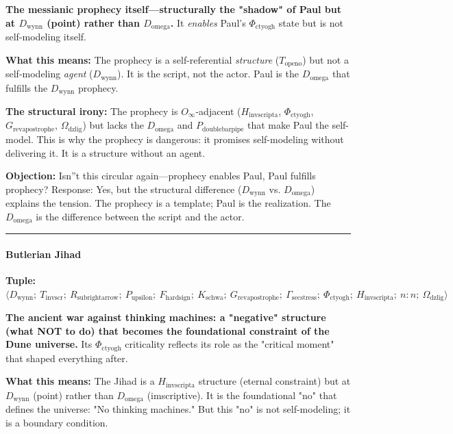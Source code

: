 \documentclass[12pt,a4paper]{article}
\begin{document}
\textbf{The messianic prophecy itself---structurally the "shadow" of Paul but at $D_{\text{wynn}}$ (point) rather than $D_{\text{omega}}$.} It \emph{enables} Paul's $\Phi_{\text{ctyogh}}$ state but is not self-modeling itself.

\textbf{What this means:} The prophecy is a self-referential \emph{structure} ($T_{\text{openo}}$) but not a self-modeling \emph{agent} ($D_{\text{wynn}}$). It is the script, not the actor. Paul is the $D_{\text{omega}}$ that fulfills the $D_{\text{wynn}}$ prophecy.

\textbf{The structural irony:} The prophecy is $O_{\infty}$-adjacent ($H_{\text{invscripta}}$, $\Phi_{\text{ctyogh}}$, $G_{\text{revapostrophe}}$, $\Omega_{\text{dzlig}}$) but lacks the $D_{\text{omega}}$ and $P_{\text{doublebarpipe}}$ that make Paul the self-model. This is why the prophecy is dangerous: it promises self-modeling without delivering it. It is a structure without an agent.

\textbf{Objection:} Isn''t this circular again---prophecy enables Paul, Paul fulfills prophecy? Response: Yes, but the structural difference ($D_{\text{wynn}}$ vs. $D_{\text{omega}}$) explains the tension. The prophecy is a template; Paul is the realization. The $D_{\text{omega}}$ is the difference between the script and the actor.

\begin{center}
\rule{0.5\textwidth}{0.4pt}
\end{center}

\paragraph{Butlerian Jihad}

\textbf{Tuple:} $\langle D_{\text{wynn}};\ T_{\text{invscr}};\ R_{\text{subrightarrow}};\ P_{\text{upsilon}};\ F_{\text{hardsign}};\ K_{\text{schwa}};\ G_{\text{revapostrophe}};\ \Gamma_{\text{secstress}};\ \Phi_{\text{ctyogh}};\ H_{\text{invscripta}};\ n{:}n;\ \Omega_{\text{dzlig}} \rangle$

\textbf{The ancient war against thinking machines: a "negative" structure (what NOT to do) that becomes the foundational constraint of the Dune universe.} Its $\Phi_{\text{ctyogh}}$ criticality reflects its role as the "critical moment" that shaped everything after.

\textbf{What this means:} The Jihad is a $H_{\text{invscripta}}$ structure (eternal constraint) but at $D_{\text{wynn}}$ (point) rather than $D_{\text{omega}}$ (imscriptive). It is the foundational "no" that defines the universe: "No thinking machines." But this "no" is not self-modeling; it is a boundary condition.
\end{document}
